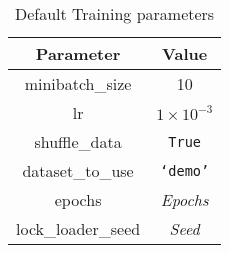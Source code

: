 \begin{table}[ht]
\centering
  \begin{tabular}{|| c | c ||}
  \hline
  Parameter & Value \\
  \hline
  minibatch\_size & 10 \\
  lr & $1\times 10^{-3}$ \\
  shuffle\_data & \texttt{True} \\
  dataset\_to\_use & \texttt{`demo'} \\
  epochs & \emph{Epochs} \\
  lock\_loader\_seed & \emph{Seed} \\
  \hline
  \end{tabular}\caption{Default Training parameters}\label{tab:eval-training-params}
\end{table}